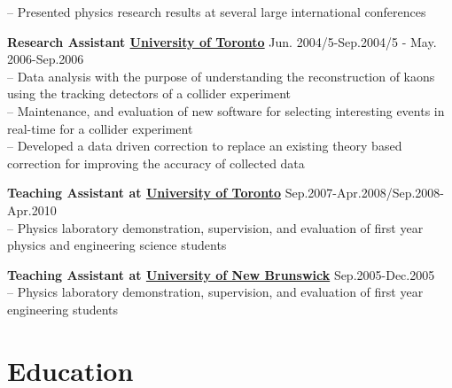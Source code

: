 \documentclass[margin,line]{resume}
\begin{document}
\begin{resume}
\begin{list2}
      -- Presented physics research results at several large international conferences
    \item \textbf{Research Assistant \href{https://www.physics.utoronto.ca/}{University of Toronto}} \hfill{Jun. 2004/5-Sep.2004/5 - May. 2006-Sep.2006}\\
      -- Data analysis with the purpose of understanding the reconstruction of kaons using the tracking detectors of a collider experiment\\
      -- Maintenance, and evaluation of new software for selecting interesting events in real-time for a collider experiment\\
      -- Developed a data driven correction to replace an existing theory based correction for improving the accuracy of collected data 
    \item \textbf{Teaching Assistant at \href{https://www.physics.utoronto.ca/}{University of Toronto}} \hfill{Sep.2007-Apr.2008/Sep.2008-Apr.2010}\\
      -- Physics laboratory demonstration, supervision, and evaluation of first year physics and engineering science students
    \item \textbf{Teaching Assistant at \href{http://www.unb.ca/fredericton/science/depts/physics/}{University of New Brunswick}} \hfill{Sep.2005-Dec.2005}\\
      -- Physics laboratory demonstration, supervision, and evaluation of first year engineering students
    \end{list2}
  
  


    \section{\mysidestyle Education}


\end{resume}
\end{document}
